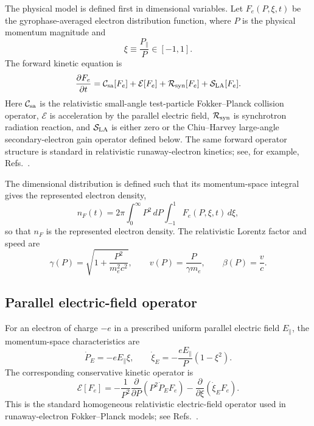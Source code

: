 \documentclass[11pt]{article}
\begin{document}
The physical model is defined first in dimensional variables.  Let
$F_e(P,\xi,t)$ be the gyrophase-averaged electron distribution function, where $P$ is
the physical momentum magnitude and
\begin{equation}
 \xi \equiv \frac{P_\parallel}{P}\in[-1,1].
\end{equation}
The forward kinetic equation is
\begin{equation}
 \frac{\partial F_e}{\partial t}
 = \mathcal C_{\rm sa}[F_e]
 + \mathcal E[F_e]
 + \mathcal R_{\rm syn}[F_e]
 + \mathcal S_{\rm LA}[F_e].
 \label{eq:dimensional_kinetic}
\end{equation}
Here $\mathcal C_{\rm sa}$ is the relativistic small-angle test-particle
Fokker--Planck collision operator, $\mathcal E$ is acceleration by the parallel
electric field, $\mathcal R_{\rm syn}$ is synchrotron radiation reaction, and
$\mathcal S_{\rm LA}$ is either zero or the Chiu--Harvey large-angle
secondary-electron gain operator defined below.  The same forward operator structure is standard in relativistic runaway-electron
kinetics; see, for example, Refs.~\cite{BraamsKarney1989,Hesslow2019Dreicer,
McDevitt2025Dynamics}.

The dimensional distribution is defined such that its momentum-space integral gives the
represented electron density,
\begin{equation}
 n_F(t)
 = 2\pi\int_0^\infty P^2\,dP\int_{-1}^{1}F_e(P,\xi,t)\,d\xi,
 \label{eq:dimensional_density}
\end{equation}
so that $n_F$ is the represented electron density.  The relativistic Lorentz factor
and speed are
\begin{equation}
 \gamma(P)=\sqrt{1+\frac{P^2}{m_e^2c^2}},
 \qquad
 v(P)=\frac{P}{\gamma m_e},
 \qquad
 \beta(P)=\frac{v}{c}.
 \label{eq:dimensional_kinematics}
\end{equation}

\subsection{Parallel electric-field operator}

For an electron of charge $-e$ in a prescribed uniform parallel electric field
$E_\parallel$, the momentum-space characteristics are
\begin{equation}
 \dot P_E=-eE_\parallel\xi,
 \qquad
 \dot\xi_E=-\frac{eE_\parallel}{P}(1-\xi^2).
 \label{eq:electric_characteristics}
\end{equation}
The corresponding conservative kinetic operator is
\begin{equation}
 \mathcal E[F_e]
 =-\frac{1}{P^2}\frac{\partial}{\partial P}
   \left(P^2\dot P_E F_e\right)
  -\frac{\partial}{\partial\xi}
   \left(\dot\xi_E F_e\right).
 \label{eq:electric_operator_dimensional}
\end{equation}
This is the standard homogeneous relativistic electric-field operator used in
runaway-electron Fokker--Planck models; see
Refs.~\cite{ConnorHastie1975,McDevitt2025Dynamics}.
\end{document}
